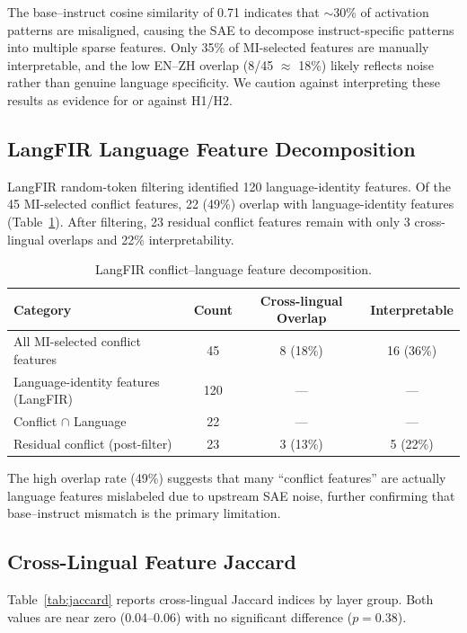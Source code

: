 \documentclass{article}
\begin{document}
The base--instruct cosine similarity of 0.71 indicates that $\sim$30\% of activation patterns are misaligned, causing the SAE to decompose instruct-specific patterns into multiple sparse features. Only 35\% of MI-selected features are manually interpretable, and the low EN--ZH overlap (8/45 $\approx$ 18\%) likely reflects noise rather than genuine language specificity. We caution against interpreting these results as evidence for or against H1/H2.

\subsection{LangFIR Language Feature Decomposition}

LangFIR random-token filtering identified 120 language-identity features. Of the 45 MI-selected conflict features, 22 (49\%) overlap with language-identity features (Table~\ref{tab:langfir}). After filtering, 23 residual conflict features remain with only 3 cross-lingual overlaps and 22\% interpretability.

\begin{table}[h]
\centering
\caption{LangFIR conflict--language feature decomposition.}
\label{tab:langfir}
\begin{tabular}{lccc}
\toprule
Category & Count & Cross-lingual Overlap & Interpretable \\
\midrule
All MI-selected conflict features & 45 & 8 (18\%) & 16 (36\%) \\
Language-identity features (LangFIR) & 120 & --- & --- \\
Conflict $\cap$ Language & 22 & --- & --- \\
Residual conflict (post-filter) & 23 & 3 (13\%) & 5 (22\%) \\
\bottomrule
\end{tabular}
\end{table}

The high overlap rate (49\%) suggests that many ``conflict features'' are actually language features mislabeled due to upstream SAE noise, further confirming that base--instruct mismatch is the primary limitation.

\subsection{Cross-Lingual Feature Jaccard}

Table~\ref{tab:jaccard} reports cross-lingual Jaccard indices by layer group. Both values are near zero (0.04--0.06) with no significant difference ($p = 0.38$).
\end{document}
